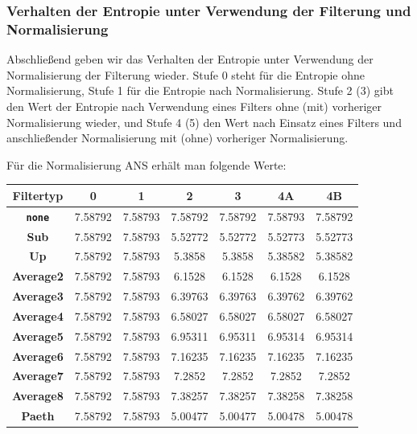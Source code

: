 \documentclass[a4paper,12pt]{article}
\begin{document}
\subsubsection{Verhalten der Entropie unter Verwendung der Filterung und Normalisierung}
Abschließend geben wir das Verhalten der Entropie unter Verwendung der Normalisierung der Filterung wieder. Stufe 0 steht für die Entropie ohne Normalisierung, Stufe 1 für die Entropie nach Normalisierung. Stufe 2 (3) gibt den Wert der Entropie nach Verwendung eines Filters ohne (mit) vorheriger Normalisierung wieder,  und Stufe 4 (5) den Wert nach Einsatz eines Filters und anschließender Normalisierung mit (ohne) vorheriger Normalisierung. 
\par
Für die Normalisierung ANS erhält man folgende Werte:
\par
\vspace{1cm}
\begin{tabular}{c | c | c | c | c | c | c}
Filtertyp & 0 &  1 & 2 & 3 & 4A & 4B
\\
\hline
\textbf{{\tt{none}}} &  7.58792 & 7.58793 & 7.58792 & 7.58792  & 7.58793 &  7.58792
\\
\textbf{Sub} & 7.58792 &   7.58793 & 5.52772 &  5.52772 &5.52773  & 5.52773 
\\
\textbf{Up} & 7.58792 &  7.58793 & 5.3858 & 5.3858  & 5.38582 & 5.38582 
\\
\textbf{Average2} & 7.58792 &  7.58793 & 6.1528 & 6.1528 & 6.1528 & 6.1528 
\\
\textbf{Average3} & 7.58792 &  7.58793 & 6.39763 & 6.39763 & 6.39762 & 6.39762 
\\
\textbf{Average4} & 7.58792 &  7.58793 & 6.58027 & 6.58027 & 6.58027 & 6.58027 
\\
\textbf{Average5} & 7.58792 &  7.58793 & 6.95311 & 6.95311 & 6.95314 & 6.95314 
\\
\textbf{Average6} & 7.58792 &  7.58793 & 7.16235 & 7.16235 & 7.16235 &  7.16235 
\\
\textbf{Average7} & 7.58792 &  7.58793 & 7.2852 &  7.2852 &  7.2852 & 7.2852 
\\
\textbf{Average8} & 7.58792 &  7.58793 & 7.38257 & 7.38257  & 7.38258 & 7.38258 
\\
\textbf{Paeth} & 7.58792 &  7.58793 & 5.00477 &  5.00477  &  5.00478 & 5.00478 
\end{tabular}
\par
\vspace{1cm}
\end{document}

